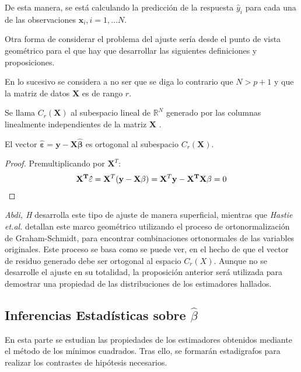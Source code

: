 \noindent De esta manera, se está calculando la predicción de la respuesta $\hat{y}_i$ para cada una de las observaciones $\mathbf{x}_i, i =1, \ldots N$. 

\noindent Otra forma de considerar el problema del ajuste sería desde el punto de vista geométrico para el que hay que desarrollar las siguientes definiciones y proposiciones.

\noindent En lo sucesivo se considera a no ser que se diga lo contrario que $N>p+1$ y que la matriz de datos $\mathbf{X}$ es de rango $r$.

\begin{defi}
Se llama  $C_{r}(\mathbf{X})$ al subespacio lineal de $\mathbb{R}^{N}$ generado por las columnas linealmente independientes de la matriz $\mathbf{X}$ \cite{Cuadras 2014}.
\end{defi}
\begin{propo}\label{prop ort}
El vector $\hat{\mathbf{\varepsilon}}=\mathbf{y}-\mathbf{X\hat{\beta}}$ es ortogonal al subespacio $C_{r}(\mathbf{X})$.
\begin{proof}
Premultiplicando por $\mathbf{X}^T$:
\begin{equation}
\begin{split}
\mathbf{X^T\hat{\mathbf{\varepsilon}}}=\mathbf{X}^T(\mathbf{y-X}\beta)=\mathbf{X}^T\mathbf{y}-\mathbf{X^T X}\beta=0 \qedhere
\end{split}
\end{equation}
\end{proof}
\end{propo}

\noindent \emph{Abdi, H} \cite{Abdi 2007} desarrolla este tipo de ajuste de manera superficial, mientras que  \emph{Hastie et.al.} \cite{Hastie 2001} detallan este marco geométrico utilizando el proceso de ortonormalización de Graham-Schmidt, para encontrar combinaciones ortonormales de las variables originales. Este proceso se basa como se puede ver, en el hecho de que el vector de residuo generado debe ser ortogonal al espacio $C_{r}(X)$. Aunque no se desarrolle el ajuste en su totalidad, la proposición anterior será utilizada para demostrar una propiedad de las distribuciones de los estimadores hallados. 

\subsection{Inferencias Estadísticas sobre $\hat{\beta}$}

\noindent En esta parte se estudian las propiedades de los estimadores obtenidos mediante el método de los mínimos cuadrados. Tras ello, se formarán estadigrafos para realizar los contrastes de hipótesis necesarios.

